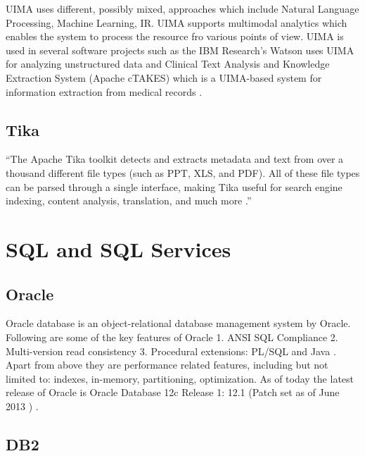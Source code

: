      UIMA uses different, possibly mixed, approaches which include
     Natural Language Processing, Machine Learning, IR. UIMA supports
     multimodal analytics which enables
     the system to process the resource fro various points of
     view. UIMA is used in several software projects such as the IBM
     Research's Watson uses UIMA for analyzing unstructured data and
     Clinical Text Analysis and Knowledge Extraction System (Apache
     cTAKES) which is a UIMA-based system for information extraction
     from medical records \cite{www-uima-slideshare}.

     \pv
     
\subsection{Tika}

     ``The Apache Tika toolkit detects and extracts metadata and text
     from over a thousand different file types (such as PPT, XLS, and
     PDF). All of these file types can be parsed through a single
     interface, making Tika useful for search engine indexing, content
     analysis, translation, and much more \cite{www-tika}.''


\section{SQL and SQL Services}
\label{S:o-sql}

\subsection{Oracle}

     Oracle database is an object-relational database management system by 
     Oracle. Following are some of the key features of Oracle
     1. ANSI SQL Compliance
     2. Multi-version read consistency
     3. Procedural extensions: PL/SQL and Java \cite{www-oracle}.
     Apart from above they are performance related features, including but not 
     limited to: indexes, in-memory, partitioning, optimization. 
     As of today the latest release of Oracle is
     Oracle Database 12c Release 1: 12.1
     (Patch set as of June 2013 ) \cite{www-oracle}.

     \pv


\subsection{DB2}

